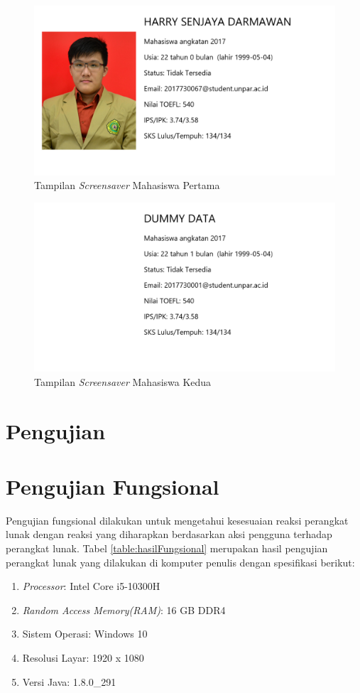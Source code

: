\begin{figure}[H]
	\centering
	\includegraphics[scale=0.3]{Gambar/hasil.png}
	\caption{Tampilan \textit{Screensaver} Mahasiswa Pertama}
	\label{fig:5_hasil}
\end{figure}

\begin{figure}[H]
	\centering
	\includegraphics[scale=0.3]{Gambar/hasil2.png}
	\caption{Tampilan \textit{Screensaver} Mahasiswa Kedua}
	\label{fig:5_hasil2}
\end{figure}


\section{Pengujian}

\section{Pengujian Fungsional}
Pengujian fungsional dilakukan untuk mengetahui kesesuaian reaksi perangkat lunak dengan reaksi yang diharapkan berdasarkan aksi pengguna terhadap perangkat lunak. Tabel \ref{table:hasilFungsional} merupakan hasil pengujian perangkat lunak yang dilakukan di komputer penulis dengan spesifikasi berikut:
\begin{enumerate}
    \item \textit{Processor}: Intel Core i5-10300H
    \item \textit{Random Access Memory(RAM)}: 16 GB DDR4
    \item Sistem Operasi: Windows 10
    \item Resolusi Layar: 1920 x 1080
    \item Versi Java: 1.8.0\_291
\end{enumerate}

